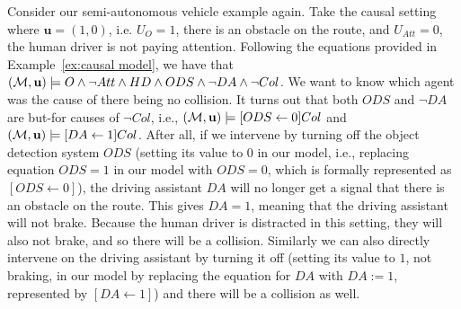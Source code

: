 \begin{example}\label{ex:causes}
    Consider our semi-autonomous vehicle example again. 
    Take the causal setting where $\mathbf{u} = (1,0)$, i.e. $U_O = 1$, there is an obstacle on the route, and $U_{Att} = 0$, the human driver is not paying attention.
    Following the equations provided in Example~\ref{ex:causal model}, we have that $(\mathcal{M},\mathbf{u}) \models O \wedge \neg Att \wedge HD \wedge ODS \wedge \neg DA \wedge \neg Col$. 
    We want to know which agent was the cause of there being no collision.
    It turns out that both $ODS$ and $\neg DA$ are but-for causes of $\neg Col$, i.e., $(\mathcal{M},\mathbf{u}) \models [ODS \leftarrow 0] Col$ and $(\mathcal{M},\mathbf{u}) \models [DA \leftarrow 1] Col$.
    After all, if we intervene by turning off the object detection system $ODS$ (setting its value to $0$ in our model, i.e., replacing equation $ODS=1$ in our model with $ODS=0$, which is formally represented as $[ODS \leftarrow 0]$), the driving assistant $DA$ will no longer get a signal that there is an obstacle on the route.
    This gives $DA =1$, meaning that the driving assistant will not brake. 
    Because the human driver is distracted in this setting, they will also not brake, and so there will be a collision. 
    Similarly we can also directly intervene on the driving assistant by turning it off (setting its value to $1$, not braking, in our model by replacing the equation for $DA$ with $DA:=1$, represented by $[DA \leftarrow 1]$) and there will be a collision as well.
\end{example}


